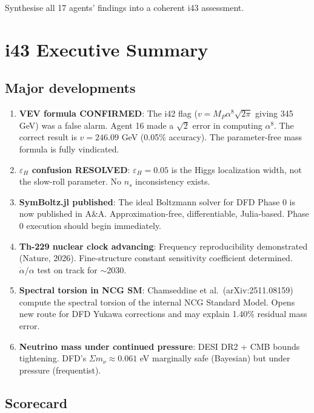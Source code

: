 \documentclass[11pt,a4paper]{article}
\begin{document}
Synthesise all 17 agents' findings into a coherent i43 assessment.

\section{i43 Executive Summary}

\subsection{Major developments}

\begin{enumerate}
\item \textbf{VEV formula CONFIRMED}: The i42 flag ($v = M_P \alpha^8 \sqrt{2\pi}$ giving 345 GeV) was a false alarm. Agent 16 made a $\sqrt{2}$ error in computing $\alpha^8$. The correct result is $v = 246.09$ GeV (0.05\% accuracy). The parameter-free mass formula is fully vindicated.

\item \textbf{$\varepsilon_H$ confusion RESOLVED}: $\varepsilon_H = 0.05$ is the Higgs localization width, not the slow-roll parameter. No $n_s$ inconsistency exists.

\item \textbf{SymBoltz.jl published}: The ideal Boltzmann solver for DFD Phase 0 is now published in A\&A. Approximation-free, differentiable, Julia-based. Phase 0 execution should begin immediately.

\item \textbf{Th-229 nuclear clock advancing}: Frequency reproducibility demonstrated (Nature, 2026). Fine-structure constant sensitivity coefficient determined. $\dot{\alpha}/\alpha$ test on track for $\sim$2030.

\item \textbf{Spectral torsion in NCG SM}: Chamseddine et al.\ (arXiv:2511.08159) compute the spectral torsion of the internal NCG Standard Model. Opens new route for DFD Yukawa corrections and may explain 1.40\% residual mass error.

\item \textbf{Neutrino mass under continued pressure}: DESI DR2 + CMB bounds tightening. DFD's $\Sigma m_\nu \approx 0.061$ eV marginally safe (Bayesian) but under pressure (frequentist).
\end{enumerate}

\subsection{Scorecard}
\end{document}
